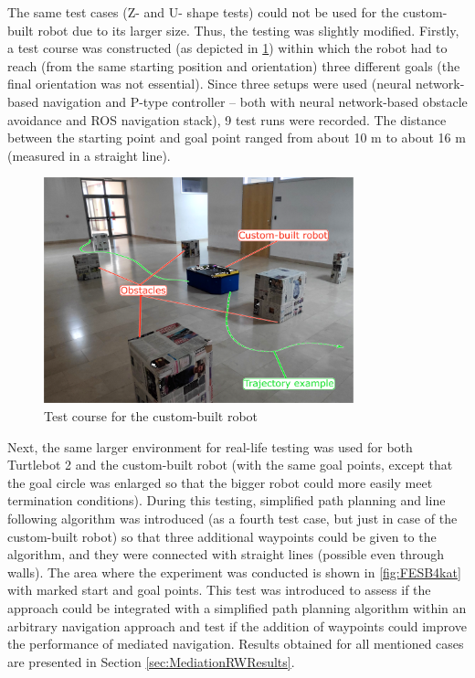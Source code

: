 The same test cases (Z- and U- shape tests) could not be used for the custom-built robot due to its larger size. Thus, the testing was slightly modified. Firstly, a test course was constructed (as depicted in \cref{fig:PaletarB401}) within which the robot had to reach (from the same starting position and orientation) three different goals (the final orientation was not essential). Since three setups were used (neural network-based navigation and P-type controller -- both with neural network-based obstacle avoidance and ROS navigation stack), 9 test runs were recorded. The distance between the starting point and goal point ranged from about 10 m to about 16 m (measured in a straight line).

\begin{figure}
    \centering
    \includegraphics[width=0.8\textwidth]{slike/res_b401_ex.png}
    \caption{Test course for the custom-built robot}
    \label{fig:PaletarB401}
\end{figure}

Next, the same larger environment for real-life testing was used for both Turtlebot 2 and the custom-built robot (with the same goal points, except that the goal circle was enlarged so that the bigger robot could more easily meet termination conditions). During this testing, simplified path planning and line following algorithm was introduced (as a fourth test case, but just in case of the custom-built robot) so that three additional waypoints could be given to the algorithm, and they were connected with straight lines (possible even through walls). The area where the experiment was conducted is shown in \cref{fig:FESB4kat} with marked start and goal points. This test was introduced to assess if the approach could be integrated with a simplified path planning algorithm within an arbitrary navigation approach and test if the addition of waypoints could improve the performance of mediated navigation. Results obtained for all mentioned cases are presented in Section \ref{sec:MediationRWResults}.

